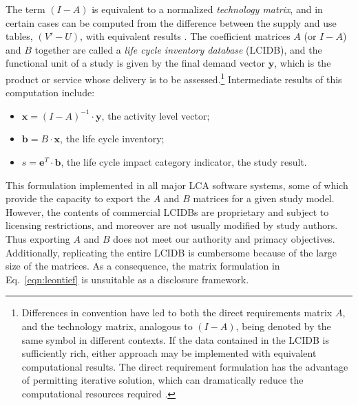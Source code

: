 The term $(I-A)$ is equivalent to a normalized \textit{technology matrix}, and in certain cases can be computed from the difference between the supply and use tables, $(V'-U)$, with equivalent results \citep{Suh_JIE_2010}. 
The coefficient matrices $A$ (or $I-A$) and $B$ together are called a \textit{life cycle inventory database} (LCIDB), and the functional unit of a study is given by the final demand vector $\mathbf{y}$, which is the product or service whose delivery is to be assessed.\footnote{%
Differences in convention have led to both the direct requirements matrix $A$, and the technology matrix, analogous to $(I-A)$, being denoted by the same symbol in different contexts.  If the data contained in the LCIDB is sufficiently rich, either approach may be implemented with equivalent computational results.  The direct requirement formulation has the advantage of permitting iterative solution, which can dramatically reduce the computational resources required \citep{Peters_JLCA_2007}.}  Intermediate results of this computation include:
\begin{itemize}
\item $\mathbf{x} = \left(I-A\right)^{-1}\cdot\mathbf{y}$, the activity level vector;
\item $\mathbf{b} = B\cdot\mathbf{x}$, the life cycle inventory;
\item $s = \mathbf{e}^T\cdot\mathbf{b}$, the life cycle impact category indicator, the study result.
\end{itemize}

This formulation implemented in all major LCA software systems, some of which provide the capacity to export the $A$ and $B$ matrices for a given study model.  However, the contents of commercial LCIDBs are proprietary and subject to licensing restrictions, and moreover are not usually modified by study authors.  Thus exporting $A$ and $B$ does not meet our authority and primacy objectives.  Additionally, replicating the entire LCIDB is cumbersome because of the large size of the matrices.   As a consequence, the matrix formulation in Eq.~\ref{eqn:leontief} is unsuitable as a disclosure framework.
